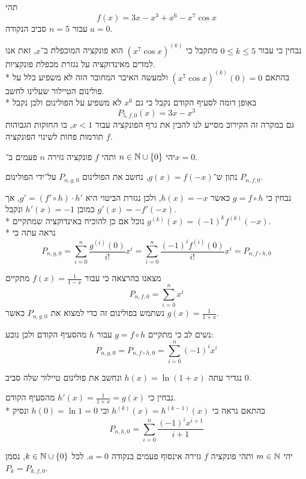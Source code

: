 \Subquestion{}
תהי
\[
	f(x) = 3x - x^3 + x^6 - x^7 \cos x
\]
עבור $n = 5$ סביב הנקודה $a = 0$.

נבחין כי עבור $0 \le k \le 5$ מתקבל כי ${(x^7 \cos x)}^{(k)}$ הוא פונקציה המוכפלת ב־$x$, זאת אנו למדים מאינדוקציה על נגזרת מכפלת פונקציות. \\*
בהתאם ${(x^7 \cos x)}^{(k)}(0) = 0$ ולמעשה האיבר המחובר הזה לא משפיע כלל על פולינום הטיילור שעלינו לחשב. \\*
באופן דומה לסעיף הקודם נקבל כי גם $x^6$ לא משפיע על הפולינום ולכן נקבל
\[
	P_{5, f, 0}(x) = 3x - x^3
\]
גם במקרה זה הקירוב מסייע לנו להבין את גרף הפונקציה עבור $x < 1$, בו החזקות הגבוהות תורמות פחות לשינוי הפונקציה $f$.

\Question{}
יהי $n \in \mathbb{N} \cup \{0\}$ ותהי $f$ פונקציה גזירה $n$ פעמים ב־$x = 0$.

\Subquestion{}
נתון ש־$g(x) = f(-x)$, נחשב את הפולינום $P_{n, g, 0}$ על־ידי הפולינום $P_{n, f, 0}$.

נבחין כי $g = f \circ h$ כאשר $h(x) = -x$, ולכן נגזרת הביטוי היא $g' = (f' \circ h) \cdot h'$, אך כמובן $h'(x) = -1$ ונקבל $g'(x) = -f'(-x)$. \\*
נוכל אם כן להוכיח באינדוקציה שמתקיים $g^{(k)}(x) = {(-1)}^k f^{(k)}(-x)$. \\*
נראה עתה כי
\[
	P_{n, g, 0}
	= \sum_{i = 0}^{n} \frac{g^{(i)}(0)}{i!} x^i
	= \sum_{i = 0}^{n} \frac{{(-1)}^i f^{(i)}(0)}{i!} x^i
	= P_{n, f \circ h, 0}
\]

\Subquestion{}
מצאנו בהרצאה כי עבור $f(x) = \frac{1}{1 - x}$ מתקיים
\[
	P_{n, f, 0} = \sum_{i = 0}^{n} x^i
\]
נשתמש בפולינום זה כדי למצוא את $P_{n, g, 0}$ כאשר $g(x) = \frac{1}{1 + x}$.

נשים לב כי מתקיים $g = f \circ h$ עבור $h$ מהסעיף הקודם ולכן נובע:
\[
	P_{n, g, 0}
	= P_{n, f \circ h, 0}
	= \sum_{i = 0}^{n} {(-1)}^i x^i
\]

\Subquestion{}
נגדיר עתה $h(x) = \ln(1 + x)$ ונחשב את פולינום טיילור שלה סביב $0$.

נבחין כי $h'(x) = \frac{1}{1 + x} = g(x)$ מהסעיף הקודם. \\*
בהתאם נראה כי $h^{(k)}(x) = h^{(k - 1)}(x)$ וכי $h(0) = \ln 1 = 0$ ונסיק
\[
	P_{n, h, 0}
	= \sum_{i = 0}^{n} \frac{{(-1)}^i x^{i + 1}}{i + 1}
\]

\Question{}
יהי $m \in \mathbb{N}$ ותהי פונקציה $f$ גזירה אינסוף פעמים בנקודה $a = 0$.
לכל $k \in \mathbb{N} \cup \{0\}$, נסמן $P_k = P_{k, f, 0}$.

\Subquestion{}
